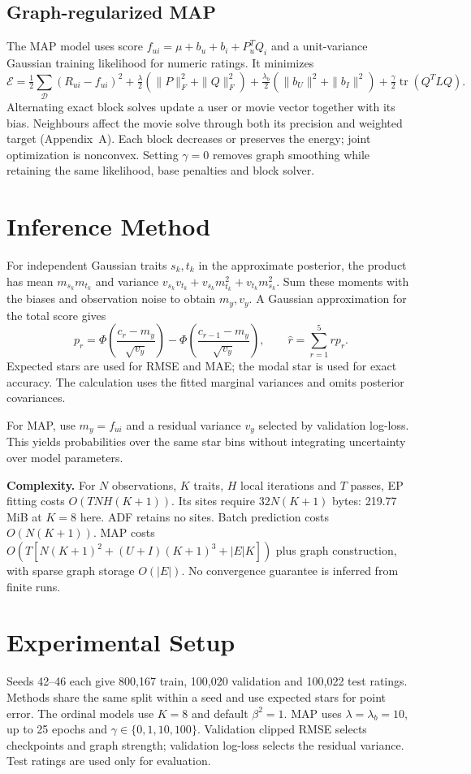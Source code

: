 \documentclass[11pt,a4paper]{article}
\begin{document}
\subsection{Graph-regularized MAP}
The MAP model uses score $f_{ui}=\mu+b_u+b_i+P_u^TQ_i$ and a unit-variance
Gaussian training likelihood for numeric ratings. It minimizes
\[
\mathcal E=\tfrac12\sum_{\mathcal D}(R_{ui}-f_{ui})^2+
\tfrac\lambda2(\|P\|_F^2+\|Q\|_F^2)+
\tfrac{\lambda_b}2(\|b_U\|^2+\|b_I\|^2)+
\tfrac\gamma2\operatorname{tr}(Q^TLQ).
\]
Alternating exact block solves update a user or movie vector together with
its bias. Neighbours affect the movie solve through both its precision and
weighted target (Appendix~A). Each block decreases or preserves the energy;
joint optimization is nonconvex. Setting $\gamma=0$ removes graph smoothing
while retaining the same likelihood, base penalties and block solver.

\section{Inference Method}
For independent Gaussian traits $s_k,t_k$ in the approximate posterior,
the product has mean $m_{s_k}m_{t_k}$ and variance
$v_{s_k}v_{t_k}+v_{s_k}m_{t_k}^2+v_{t_k}m_{s_k}^2$. Sum these moments with
the biases and observation noise to obtain $m_y,v_y$. A Gaussian
approximation for the total score gives
\[
p_r=\Phi\left(\frac{c_r-m_y}{\sqrt{v_y}}\right)-
\Phi\left(\frac{c_{r-1}-m_y}{\sqrt{v_y}}\right),\qquad
\hat r=\sum_{r=1}^5 r p_r.
\]
Expected stars are used for RMSE and MAE; the modal star is used for exact
accuracy. The calculation uses the fitted marginal variances and omits
posterior covariances.

For MAP, use $m_y=f_{ui}$ and a residual variance $v_y$ selected by
validation log-loss. This yields probabilities over the same star bins
without integrating uncertainty over model parameters.

\textbf{Complexity.} For $N$ observations, $K$ traits, $H$ local iterations
and $T$ passes, EP fitting costs $O(TNH(K+1))$. Its sites require
$32N(K+1)$ bytes: 219.77 MiB at $K=8$ here. ADF retains no sites. Batch
prediction costs $O(N(K+1))$. MAP costs
$O(T[N(K+1)^2+(U+I)(K+1)^3+|E|K])$ plus graph construction, with sparse
graph storage $O(|E|)$. No convergence guarantee is inferred from finite runs.

\clearpage
\section{Experimental Setup}
Seeds 42--46 each give 800,167 train, 100,020 validation and 100,022 test
ratings. Methods share the same split within a seed and use expected stars
for point error. The ordinal models use $K=8$ and default $\beta^2=1$.
MAP uses $\lambda=\lambda_b=10$, up to 25 epochs and
$\gamma\in\{0,1,10,100\}$. Validation clipped RMSE selects checkpoints and
graph strength; validation log-loss selects the residual variance. Test
ratings are used only for evaluation.
\end{document}
